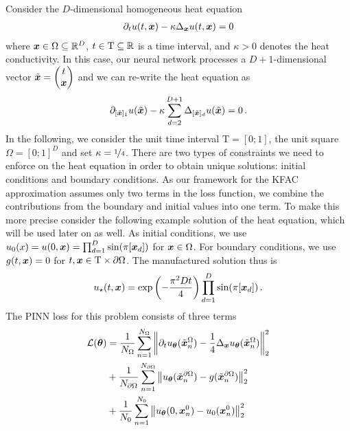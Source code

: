 Consider the $D$-dimensional%
homogeneous heat equation
\begin{align*}
  \partial_{t} u(t, {\bm{x}})
  -
  \kappa \Delta_{{\bm{x}}} u(t, {\bm{x}})
  =
  0
\end{align*}
where ${\bm{x}} \in \Omega \subseteq {\mathbb{R}}^D$, $t \in \mathrm{T} \subseteq {\mathbb{R}}$ is a time interval, and $\kappa >0$ denotes the heat conductivity. In this case, our neural network processes a $D+1$-dimensional vector $\tilde{{\bm{x}}} =
\begin{pmatrix} t \\ {\bm{x}} \end{pmatrix}$ and we can re-write the heat equation as
\begin{align*}
  \partial_{[\tilde{{\bm{x}}}]_1} u(\tilde{{\bm{x}}})
  -
  \kappa \sum_{d=2}^{D+1} \Delta_{[\tilde{{\bm{x}}}]_d} u(\tilde{{\bm{x}}})
  =
  0\,.
\end{align*}
In the following, we consider the unit time interval $\mathrm{T} = [0;1]$, the unit square $\Omega = [0;1]^D$ and set $\kappa = \nicefrac{1}{4}$. There are two types of constraints we need to enforce on the heat equation in order to obtain unique solutions: initial conditions and boundary conditions. As our framework for the KFAC approximation assumes only two terms in the loss function, we combine the contributions from the boundary and initial values into one term. To make this more precise consider the following example solution of the heat equation, which will be used later on as well.
As initial conditions, we use $u_0(x) = u(0, {\bm{x}}) = \prod_{d=1}^D \sin(\pi [{\bm{x}}_d])$ for ${\bm{x}} \in \Omega$.
For boundary conditions, we use $g(t, {\bm{x}}) = 0$ for $t, {\bm{x}} \in \mathrm{T} \times \partial\Omega$.
The manufactured solution thus is
\begin{align*}
  u_{\star}(t, {\bm{x}})
  =
  \exp \left(-\frac{\pi^2 D t}{4} \right)
  \prod_{d=1}^D \sin(\pi [{\bm{x}}_d])\,.
\end{align*}
The PINN loss for this problem consists of three terms
\begin{align*}
  {\mathcal{L}}({\bm{\theta}})
  &=
    \frac{1}{N_{\Omega}}
    \sum_{n=1}^{N_{\Omega}}
    \left\lVert
    \partial_t u_{{\bm{\theta}}}(\tilde{{\bm{x}}}_n^{\Omega})
    -
    \frac{1}{4} \Delta_{{\bm{x}}} u_{{\bm{\theta}}}(\tilde{{\bm{x}}}_n^{\Omega})
    \right\rVert^2_2
  \\
  &+
    \frac{1}{N_{\partial\Omega}}
    \sum_{n=1}^{N_{\partial\Omega}}
    \left\lVert
    u_{{\bm{\theta}}}(\tilde{{\bm{x}}}_n^{\partial\Omega})
    -
    g(\tilde{{\bm{x}}}_n^{\partial\Omega})
    \right\rVert^2_2
  \\
  &+
    \frac{1}{N_0}
    \sum_{n=1}^{N_0}
    \left\lVert
    u_{{\bm{\theta}}}(0, {\bm{x}}_n^0)
    -
    u_0( {\bm{x}}_n^0)
    \right\rVert^2_2
\end{align*}
